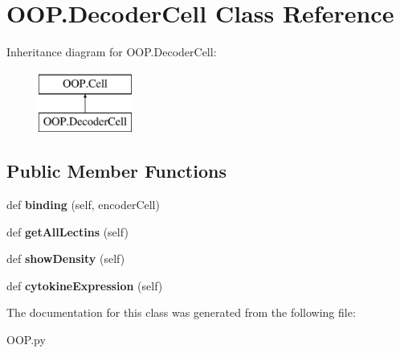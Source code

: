 \hypertarget{class_o_o_p_1_1_decoder_cell}{}\section{O\+O\+P.\+Decoder\+Cell Class Reference}
\label{class_o_o_p_1_1_decoder_cell}
Inheritance diagram for O\+O\+P.\+Decoder\+Cell\+:\begin{figure}[H]
\begin{center}
\leavevmode
\includegraphics[height=2.000000cm]{class_o_o_p_1_1_decoder_cell}
\end{center}
\end{figure}
\subsection*{Public Member Functions}
\begin{DoxyCompactItemize}
\item 
\mbox{\label{class_o_o_p_1_1_decoder_cell_ae361486a3a0bfd2be707a6fb6fc76222}} 
def {\bfseries binding} (self, encoder\+Cell)
\item 
\mbox{\label{class_o_o_p_1_1_decoder_cell_a08d8eafb492ffde3dc5d461997faf206}} 
def {\bfseries get\+All\+Lectins} (self)
\item 
\mbox{\label{class_o_o_p_1_1_decoder_cell_a8c5a2b96eb3d7fda5ec0ae2e6b3bb3e3}} 
def {\bfseries show\+Density} (self)
\item 
\mbox{\label{class_o_o_p_1_1_decoder_cell_af8a8eee539e3b3c83f5d7ea550a5eb21}} 
def {\bfseries cytokine\+Expression} (self)
\end{DoxyCompactItemize}


The documentation for this class was generated from the following file\+:\begin{DoxyCompactItemize}
\item 
O\+O\+P.\+py\end{DoxyCompactItemize}

